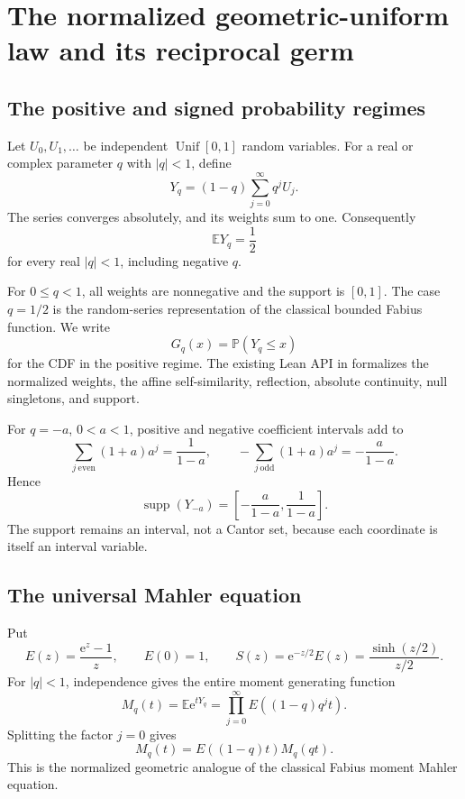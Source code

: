 \documentclass[11pt,oneside]{article}
\numberwithin{equation}{section}
\theoremstyle{definition}
\theoremstyle{remark}
\newcommand{\supp}{\operatorname{supp}}
\newcommand{\Prob}{\mathbb P}
\newcommand{\E}{\mathbb E}
\newcommand{\e}{\mathrm e}
\begin{document}
\section{The normalized geometric-uniform law and its reciprocal germ}
\label{sec:master-germ}

\subsection{The positive and signed probability regimes}

Let $U_0,U_1,\ldots$ be independent $\operatorname{Unif}[0,1]$ random
variables.  For a real or complex parameter $q$ with $|q|<1$, define
\begin{equation}
 Y_q=(1-q)\sum_{j=0}^{\infty}q^jU_j.
 \label{eq:Yq}
\end{equation}
The series converges absolutely, and its weights sum to one.  Consequently
\begin{equation}
 \E Y_q=\frac12
 \label{eq:Yq-mean}
\end{equation}
for every real $|q|<1$, including negative $q$.

For $0\le q<1$, all weights are nonnegative and the support is $[0,1]$.  The
case $q=1/2$ is the random-series representation of the classical bounded
Fabius function.  We write
\begin{equation}
 G_q(x)=\Prob(Y_q\le x)
 \label{eq:Gq}
\end{equation}
for the CDF in the positive regime.  The existing Lean API in
 formalizes the normalized weights, the affine
self-similarity, reflection, absolute continuity, null singletons, and support.

For $q=-a$, $0<a<1$, positive and negative coefficient intervals add to
\[
 \sum_{j\ \mathrm{even}}(1+a)a^j=\frac1{1-a},
 \qquad
 -\sum_{j\ \mathrm{odd}}(1+a)a^j=-\frac a{1-a}.
\]
Hence
\begin{equation}
 \supp(Y_{-a})=\left[-\frac a{1-a},\frac1{1-a}\right].
 \label{eq:negative-support}
\end{equation}
The support remains an interval, not a Cantor set, because each coordinate is
itself an interval variable.

\subsection{The universal Mahler equation}

Put
\begin{equation}
 E(z)=\frac{\e^z-1}{z},\qquad E(0)=1,
 \qquad
 S(z)=\e^{-z/2}E(z)=\frac{\sinh(z/2)}{z/2}.
 \label{eq:E-S}
\end{equation}
For $|q|<1$, independence gives the entire moment generating function
\begin{equation}
 M_q(t)=\E\e^{tY_q}
 =\prod_{j=0}^{\infty}E\!\left((1-q)q^jt\right).
 \label{eq:Mq-inside}
\end{equation}
Splitting the factor $j=0$ gives
\begin{equation}
 \boxed{M_q(t)=E((1-q)t)M_q(qt).}
 \label{eq:Mahler}
\end{equation}
This is the normalized geometric analogue of the classical Fabius moment
Mahler equation.
\end{document}
